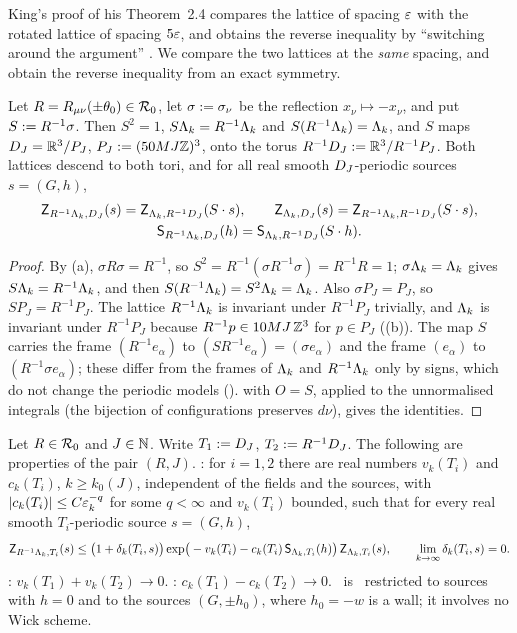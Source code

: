 King's proof of his Theorem~2.4 compares the lattice of spacing $\varepsilon$ with the rotated lattice of spacing $5\varepsilon$, and obtains the reverse inequality by ``switching around the argument'' \cite[p.~337]{K2}. We compare the two lattices at the \emph{same} spacing, and obtain the reverse inequality from an exact symmetry.

\begin{lemma}\label{rot:lem:inv}
Let $R=R_{\mu\nu}(\pm\theta_0)\in\mathcal R_0$, let $\sigma:=\sigma_\nu$ be the reflection $x_\nu\mapsto-x_\nu$, and put $S:= R^{-1}\sigma$. Then $S^2=1$, $S\Lambda_k=R^{-1}\Lambda_k$ and $S(R^{-1}\Lambda_k)=\Lambda_k$, and $S$ maps $D_J=\mathbb R^3/P_J$, $P_J:=(50MJ\mathbb Z)^3$, onto the torus $R^{-1}D_J:=\mathbb R^3/R^{-1}P_J$. Both lattices descend to both tori, and for all real smooth $D_J$-periodic sources $s=(G,h)$,
\begin{gather*}
\mathsf Z_{R^{-1}\Lambda_k,D_J}(s)=\mathsf Z_{\Lambda_k,R^{-1}D_J}(S\cdot s),\qquad
\mathsf Z_{\Lambda_k,D_J}(s)=\mathsf Z_{R^{-1}\Lambda_k,R^{-1}D_J}(S\cdot s),\\
\mathsf S_{R^{-1}\Lambda_k,D_J}(h)=\mathsf S_{\Lambda_k,R^{-1}D_J}(S\cdot h).
\end{gather*}
\end{lemma}

\begin{proof}
By (a), $\sigma R\sigma=R^{-1}$, so $S^2=R^{-1}(\sigma R^{-1}\sigma)=R^{-1}R=1$; $\sigma\Lambda_k=\Lambda_k$ gives $S\Lambda_k=R^{-1}\Lambda_k$, and then $S(R^{-1}\Lambda_k)=S^2\Lambda_k=\Lambda_k$. Also $\sigma P_J=P_J$, so $SP_J=R^{-1}P_J$. The lattice $R^{-1}\Lambda_k$ is invariant under $R^{-1}P_J$ trivially, and $\Lambda_k$ is invariant under $R^{-1}P_J$ because $R^{-1}p\in10MJ\,\mathbb Z^3$ for $p\in P_J$ ((b)). The map $S$ carries the frame $(R^{-1}e_\alpha)$ to $(SR^{-1}e_\alpha)=(\sigma e_\alpha)$ and the frame $(e_\alpha)$ to $(R^{-1}\sigma e_\alpha)$; these differ from the frames of $\Lambda_k$ and $R^{-1}\Lambda_k$ only by signs, which do not change the periodic models ().  with $O=S$, applied to the unnormalised integrals (the bijection of configurations preserves $d\nu$), gives the identities.
\end{proof}

\begin{definition}\label{rot:hyp:F}
Let $R\in\mathcal R_0$ and $J\in\mathbb N$. Write $T_1:=D_J$, $T_2:= R^{-1}D_J$. The following are properties of the pair $(R,J)$.
\hypF: for $i=1,2$ there are real numbers $v_k(T_i)$ and $c_k(T_i)$, $k\ge k_0(J)$, independent of the fields and the sources, with $|c_k(T_i)|\le C\varepsilon_k^{-q}$ for some $q<\infty$ and $v_k(T_i)$ bounded, such that for every real smooth $T_i$-periodic source $s=(G,h)$,
\[
\mathsf Z_{R^{-1}\Lambda_k,T_i}(s)\le\big(1+\delta_k(T_i,s)\big)\exp\!\big(-v_k(T_i)-c_k(T_i)\,\mathsf S_{\Lambda_k,T_i}(h)\big)\,\mathsf Z_{\Lambda_k,T_i}(s),
\qquad\lim_{k\to\infty}\delta_k(T_i,s)=0 .
\]
\hypV: $v_k(T_1)+v_k(T_2)\to0$. \hypCc: $c_k(T_1)-c_k(T_2)\to0$.
\hypFz\ is \hypF\ restricted to sources with $h=0$ and to the sources $(G,\pm h_0)$, where $h_0=-w$ is a wall; it involves no Wick scheme.
\end{definition}

